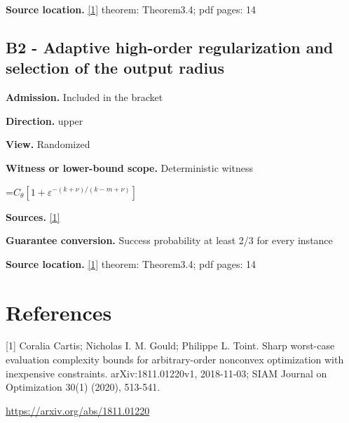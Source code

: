 \documentclass[10pt,a4paper]{article}
\newcommand{\AtlasMath}[1]{\par\begingroup\centering\setbox0=\hbox{$\displaystyle #1$}\ifdim\wd0>1.4\linewidth\typeout{ATLAS WIDE FORMULA: \the\wd0}\fi\ifdim\wd0>\linewidth\resizebox{\linewidth}{!}{\box0}\else\box0\fi\par\endgroup}
\begin{document}
\textbf{Source location.} \href{https://arxiv.org/abs/1811.01220}{[1]} theorem: Theorem3.4; pdf pages: 14

\subsection{B2 - Adaptive high-order regularization and selection of the output radius}
\textbf{Admission.} Included in the bracket

\textbf{Direction.} upper

\textbf{View.} Randomized

\textbf{Witness or lower-bound scope.} Deterministic witness

\AtlasMath{C_\theta[1+\varepsilon^{-(k+\nu)/(k-m+\nu)}]}
\textbf{Sources.} \href{https://arxiv.org/abs/1811.01220}{[1]}

\textbf{Guarantee conversion.} Success probability at least 2/3 for every instance

\textbf{Source location.} \href{https://arxiv.org/abs/1811.01220}{[1]} theorem: Theorem3.4; pdf pages: 14

\section{References}
[1] Coralia Cartis; Nicholas I. M. Gould; Philippe L. Toint. Sharp worst-case evaluation complexity bounds for arbitrary-order nonconvex optimization with inexpensive constraints. arXiv:1811.01220v1, 2018-11-03; SIAM Journal on Optimization 30(1) (2020), 513-541.

\url{https://arxiv.org/abs/1811.01220}
\end{document}

